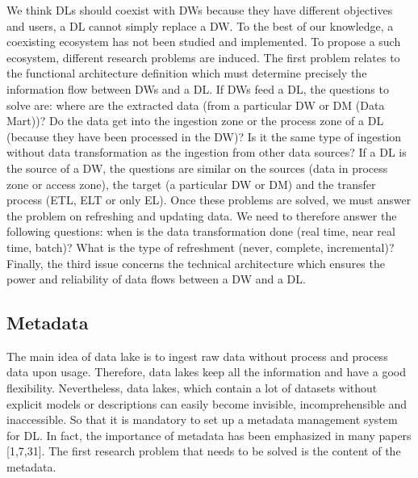 \documentclass[a4paper,12pt,notitlepage,twoside,openright]{article}
\begin{document}
We think DLs should coexist with DWs because they have different
objectives and users, a DL cannot simply replace a DW. To the best of
our knowledge, a coexisting ecosystem has not been studied and
implemented. To propose a such ecosystem, different research problems
are induced. The first problem relates to the functional architecture
definition which must determine precisely the information flow between
DWs and a DL. If DWs feed a DL, the questions to solve are: where are
the extracted data (from a particular DW or DM (Data Mart))? Do the data
get into the ingestion zone or the process zone of a DL (because they
have been processed in the DW)? Is it the same type of ingestion without
data transformation as the ingestion from other data sources? If a DL is
the source of a DW, the questions are similar on the sources (data in
process zone or access zone), the target (a particular DW or DM) and the
transfer process (ETL, ELT or only EL). Once these problems are solved,
we must answer the problem on refreshing and updating data. We need to
therefore answer the following questions: when is the data
transformation done (real time, near real time, batch)? What is the type
of refreshment (never, complete, incremental)? Finally, the third issue
concerns the technical architecture which ensures the power and
reliability of data flows between a DW and a DL.

\hypertarget{metadata}{%
\subsection{Metadata}\label{metadata}}

The main idea of data lake is to ingest raw data without process and
process data upon usage. Therefore, data lakes keep all the information
and have a good flexibility. Nevertheless, data lakes, which contain a
lot of datasets without explicit models or descriptions can easily
become invisible, incomprehensible and inaccessible. So that it is
mandatory to set up a metadata management system for DL. In fact, the
importance of metadata has been emphasized in many papers {[}1,7,31{]}.
The first research problem that needs to be solved is the content of the
metadata.
\end{document}
